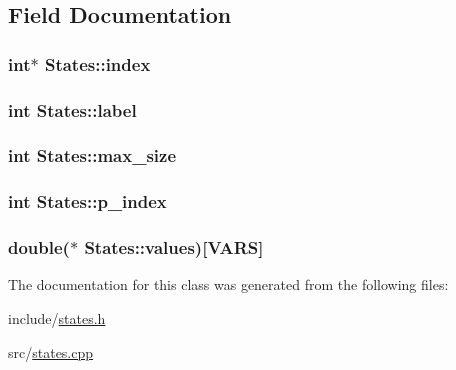 \subsection{Field Documentation}
\subsubsection[{index}]{\setlength{\rightskip}{0pt plus 5cm}int$\ast$ States\+::index}\hypertarget{classStates_ac7f438346962624026633389d156b5d0}{}\label{classStates_ac7f438346962624026633389d156b5d0}
\subsubsection[{label}]{\setlength{\rightskip}{0pt plus 5cm}int States\+::label}\hypertarget{classStates_ab444a833f85348e8a850962da6c2c987}{}\label{classStates_ab444a833f85348e8a850962da6c2c987}
\subsubsection[{max\+\_\+size}]{\setlength{\rightskip}{0pt plus 5cm}int States\+::max\+\_\+size\hspace{0.3cm}{\ttfamily [private]}}\hypertarget{classStates_a97d0d50850ab25e50914982341bba129}{}\label{classStates_a97d0d50850ab25e50914982341bba129}
\subsubsection[{p\+\_\+index}]{\setlength{\rightskip}{0pt plus 5cm}int States\+::p\+\_\+index}\hypertarget{classStates_a13e3842ad77b702e0f68cf875ded9534}{}\label{classStates_a13e3842ad77b702e0f68cf875ded9534}
\subsubsection[{values}]{\setlength{\rightskip}{0pt plus 5cm}double($\ast$ States\+::values)\mbox{[}{\bf V\+A\+RS}\mbox{]}}\hypertarget{classStates_a8b9a87b26c50e560d98c98d7e18f36b4}{}\label{classStates_a8b9a87b26c50e560d98c98d7e18f36b4}


The documentation for this class was generated from the following files\+:\begin{DoxyCompactItemize}
\item 
include/\hyperlink{states_8h}{states.\+h}\item 
src/\hyperlink{states_8cpp}{states.\+cpp}\end{DoxyCompactItemize}

